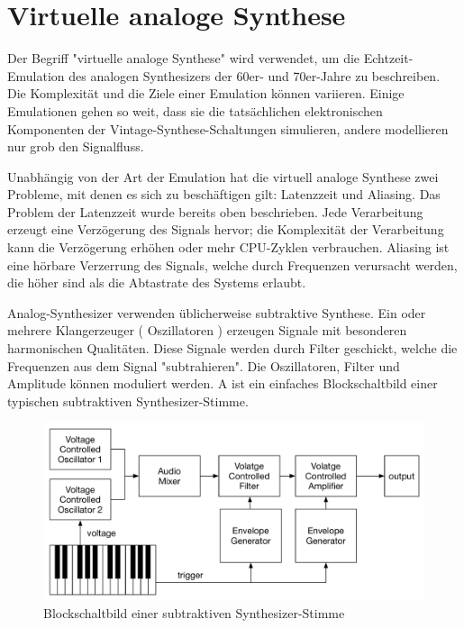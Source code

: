 \section{Virtuelle analoge Synthese}

Der Begriff  "virtuelle analoge Synthese" wird verwendet, um die Echtzeit-Emulation des analogen Synthesizers der 60er- und 70er-Jahre zu beschreiben. Die Komplexität und die Ziele einer Emulation können variieren. Einige Emulationen gehen so weit, dass sie die tatsächlichen elektronischen Komponenten der Vintage-Synthese-Schaltungen simulieren, andere modellieren nur grob den Signalfluss.

Unabhängig von der Art der Emulation hat die virtuell analoge Synthese zwei Probleme, mit denen es sich zu beschäftigen gilt:  Latenzzeit und Aliasing. Das Problem der Latenzzeit wurde bereits oben beschrieben. Jede Verarbeitung erzeugt  eine Verzögerung des Signals hervor; die Komplexität der Verarbeitung kann die Verzögerung erhöhen oder mehr CPU-Zyklen verbrauchen. Aliasing ist eine hörbare Verzerrung des Signals, welche durch Frequenzen verursacht werden, die höher sind als die Abtastrate des Systems erlaubt.

Analog-Synthesizer verwenden üblicherweise subtraktive Synthese. Ein oder mehrere Klangerzeuger ( Oszillatoren ) erzeugen Signale mit besonderen harmonischen Qualitäten. Diese Signale werden durch Filter geschickt, welche die Frequenzen aus dem Signal "subtrahieren". Die Oszillatoren, Filter und Amplitude können moduliert werden. A ist ein einfaches Blockschaltbild einer typischen subtraktiven Synthesizer-Stimme.

\begin{figure}[H]
    \centering
    \includegraphics[width=\textwidth]{assets/synth_voice_block.pdf}
    \caption{Blockschaltbild einer subtraktiven Synthesizer-Stimme}
    \label{fig:synth_voice_block}
\end{figure}


